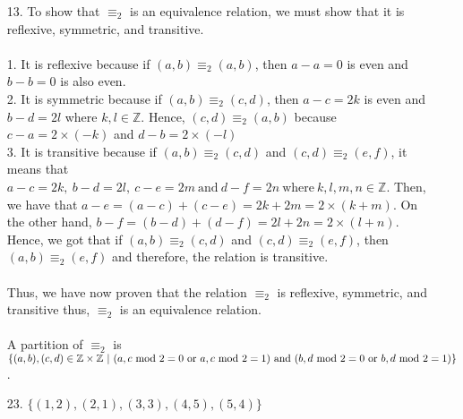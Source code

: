 \documentclass[12pt, a4paper]{article}
\newcommand{\ints}{\mathbb{Z}}
\begin{document}
\begin{itemize}
\item[]
\item[]

\item[13.]
To show that $\equiv_2$ is an equivalence relation, we must show that it is reflexive, symmetric, and transitive.\\\\
1. It is reflexive because if $(a, b) \equiv_2 (a, b)$, then $a - a = 0$ is even and $b - b = 0$ is also even.\\
2. It is symmetric because if $(a, b) \equiv_2 (c, d)$, then $a - c = 2k$ is even and $b - d = 2l$ where $k, l \in \ints$.
Hence, $(c, d) \equiv_2 (a, b)$ because $c - a = 2 \times (-k)$ and $d - b = 2 \times (-l)$\\
3. It is transitive because if $(a, b) \equiv_2 (c, d)$ and $(c, d) \equiv_2 (e, f)$, it means that
$a - c = 2k,\ b - d = 2l, \ c - e = 2m \ \mbox{and} \ d - f = 2n \ \mbox{where} \ k,l,m,n \in \ints$.
Then, we have that $a - e = (a - c) + (c - e) = 2k + 2m = 2 \times (k + m)$. On the other hand,
$b - f = (b - d) + (d - f) = 2l + 2n = 2 \times (l + n)$. Hence, we got that if $(a, b) \equiv_2 (c, d)$ and $(c, d) \equiv_2 (e, f)$,
then $(a, b) \equiv_2 (e, f)$ and therefore, the relation is transitive.\\\\
Thus, we have now proven that the relation $\equiv_2$ is reflexive, symmetric, and transitive thus, $\equiv_2$ is an equivalence relation.\\\\
A partition of $\equiv_2$ is $\{(a, b), (c, d) \in \ints \times \ints \ | \ (a, c \mbox{ mod } 2 = 0 \mbox{ or } a, c \mbox{ mod } 2 = 1) \mbox{ and }\\ (b, d \mbox{ mod } 2 = 0 \mbox{ or } b, d \mbox{ mod } 2 = 1)\}$.

\item[]
\item[]

\item[23.]
$\{(1, 2), (2, 1), (3, 3), (4, 5), (5, 4)\}$

\item[]
\item[]


\end{itemize}
\end{document}
